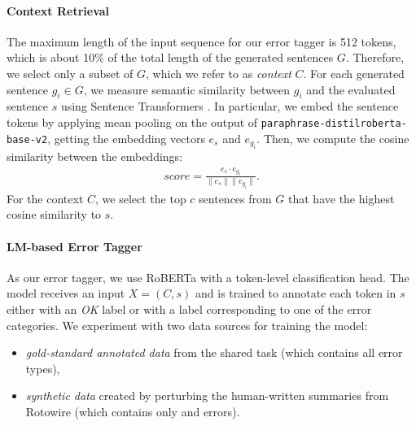 \paragraph{Context Retrieval} The maximum length of the input sequence for our error tagger is 512 tokens, which is about 10\% of the total length of the generated sentences $G$. Therefore, we select only a subset of $G$, which we refer to as \emph{context} $C$. For each generated sentence $g_i\in G$, we measure semantic similarity between $g_i$ and the evaluated sentence $s$ using Sentence Transformers \cite{reimers-gurevych-2019-sentence}. In particular, we embed the sentence tokens by applying mean pooling on the output of \texttt{paraphrase-distilroberta-base-v2}, getting the embedding vectors $e_{s}$ and $e_{g_i}$. Then, we compute the cosine similarity between the embeddings:
\begin{align}
    score = \frac{e_s \cdot e_{g_i}}{\lVert e_s \rVert \lVert e_{g_i} \rVert}.
\end{align}
For the context $C$, we select the top $c$ sentences from $G$ that have the highest cosine similarity to $s$.


\paragraph{LM-based Error Tagger}
As our error tagger, we use RoBERTa \cite{liuRoBERTaRobustlyOptimized2019} with a token-level classification head. The model receives an input $X = (C, s)$ and is trained to annotate each token in $s$ either with an \textit{OK} label or with a label corresponding to one of the error categories. We experiment with two data sources for training the model:
\begin{itemize}
    \item \emph{gold-standard annotated data} from the shared task (which contains all error types),
    \item \emph{synthetic data} created by perturbing the human-written summaries from Rotowire (which contains only  and  errors).
\end{itemize}


